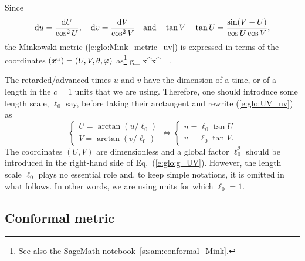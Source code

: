 Since
\[
    \mathrm{d} u = \frac{\mathrm{d} U}{\cos^2 U}, \quad \mathrm{d} v = \frac{\mathrm{d} V}{\cos^2 V}
    \quad\mbox{and}\quad
    \tan V - \tan U = \frac{\sin(V-U)}{\cos U \cos V},
\]
the Minkowski metric (\ref{e:glo:Mink_metric_uv})
is expressed in terms of the coordinates $(x^\alpha)=(U,V,\theta,\varphi)$
as\footnote{See also the SageMath notebook~\ref{s:sam:conformal_Mink}.}
\be \label{e:glo:g_UV}
    g_{\mu\nu} \D x^\mu \D x^\nu = 
     .
\ee

\begin{remark}
The retarded/advanced times $u$ and $v$ have the dimension of a time, or of a
length in the $c=1$ units that we are using. Therefore, one should introduce
some length scale, $\ell_0$ say, before taking their arctangent and rewrite
(\ref{e:glo:UV_uv}) as
\[
    \left\{ \begin{array}{l}
    U = \arctan (u/\ell_0) \\
    V = \arctan (v/\ell_0)
    \end{array} \right.
    \iff
   \left\{ \begin{array}{l}
    u = \ell_0 \tan U \\
    v = \ell_0 \tan V .
    \end{array} \right.
\]
The coordinates $(U,V)$ are dimensionless and a global factor $\ell_0^2$ should be
introduced in the right-hand side of Eq.~(\ref{e:glo:g_UV}).
However, the length scale $\ell_0$ plays no essential role and, to keep simple notations,
it is omitted in what follows. In other words, we are using units for
which $\ell_0=1$.
\end{remark}

\subsection{Conformal metric} \label{s:glo:conf_metric}

